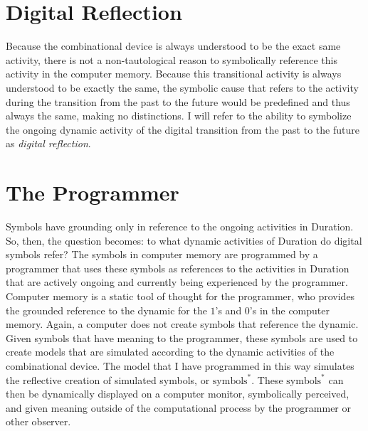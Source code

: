 \section{Digital Reflection}
\label{section:digital_reflection}

Because the combinational device is always understood to be the exact
same activity, there is not a non-tautological reason to symbolically
reference this activity in the computer memory.  Because this
transitional activity is always understood to be exactly the same, the
symbolic cause that refers to the activity during the transition from
the past to the future would be predefined and thus always the same,
making no distinctions.  I will refer to the ability to symbolize the
ongoing dynamic activity of the digital transition from the past to
the future as \emph{digital reflection}.

\section{The Programmer}

Symbols have grounding only in reference to the ongoing activities in
Duration.  So, then, the question becomes: to what dynamic activities
of Duration do digital symbols refer?  The symbols in computer memory
are programmed by a programmer that uses these symbols as references
to the activities in Duration that are actively ongoing and currently
being experienced by the programmer.  Computer memory is a static tool
of thought for the programmer, who provides the grounded reference to
the dynamic for the $1$'s and $0$'s in the computer memory.  Again, a
computer does not create symbols that reference the dynamic.  Given
symbols that have meaning to the programmer, these symbols are used to
create models that are simulated according to the dynamic activities
of the combinational device.  The model that I have programmed in this
way simulates the reflective creation of simulated symbols, or
$\text{symbols}^*$.  These $\text{symbols}^*$ can then be dynamically
displayed on a computer monitor, symbolically perceived, and given
meaning outside of the computational process by the programmer or
other observer.

